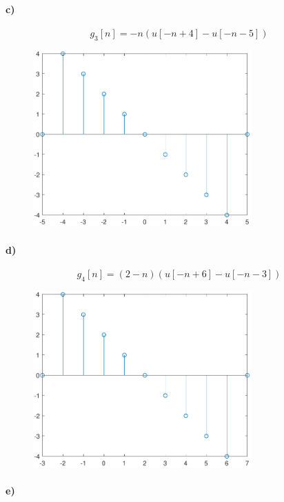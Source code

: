 \documentclass[12pt]{article}
\begin{document}
\paragraph{c)}

\[g_3[n]=-n(u[-n+4]-u[-n-5])\]
\begin{figure}[H]
    \begin{center}
        \includegraphics[width=3.3in]{problem1c.pdf}
    \end{center}
\end{figure}

\paragraph{d)}

\[g_4[n]=(2-n)(u[-n+6]-u[-n-3])\]
\begin{figure}[H]
    \begin{center}
        \includegraphics[width=3.3in]{problem1d.pdf}
    \end{center}
\end{figure}

\paragraph{e)}
\end{document}
